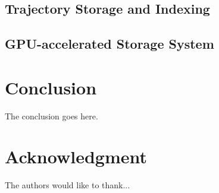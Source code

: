 \documentclass[conference]{IEEEtran}
\begin{document}
\subsection{Trajectory Storage and Indexing}
\subsection{GPU-accelerated Storage System}


\section{Conclusion}
The conclusion goes here.





\section*{Acknowledgment}


The authors would like to thank...





\IEEEtriggercmd{\enlargethispage{-5in}}




%






\end{document}
